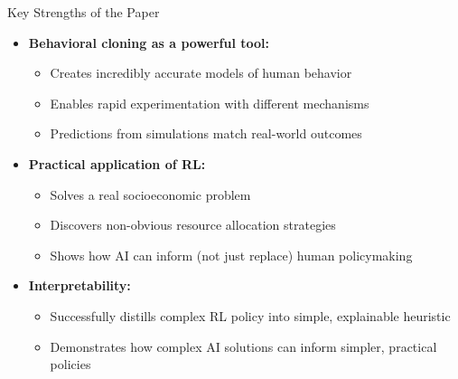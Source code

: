 \documentclass[aspectratio=169]{beamer} %
\begin{document}
\begin{frame}{Key Strengths of the Paper}
\begin{itemize}
    \item \textbf{Behavioral cloning as a powerful tool:}
    \begin{itemize}
        \item Creates incredibly accurate models of human behavior
        \item Enables rapid experimentation with different mechanisms
        \item Predictions from simulations match real-world outcomes
    \end{itemize}
    
    \item \textbf{Practical application of RL:}
    \begin{itemize}
        \item Solves a real socioeconomic problem
        \item Discovers non-obvious resource allocation strategies
        \item Shows how AI can inform (not just replace) human policymaking
    \end{itemize}
    
    \item \textbf{Interpretability:}
    \begin{itemize}
        \item Successfully distills complex RL policy into simple, explainable heuristic
        \item Demonstrates how complex AI solutions can inform simpler, practical policies
    \end{itemize}
\end{itemize}
\end{frame}
\end{document}
